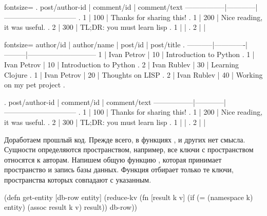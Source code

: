 \pagebreak[4]

\begin{english}
  \begin{text*}{fontsize=\small}
. post/author-id | comment/id |         comment/text
-----------------|------------|------------------------------
.              1 |        100 | Thanks for sharing this!
.              1 |        200 | Nice reading, it was useful.
.              2 |        300 | TL;DR: you must learn lisp
.              1 |            |
.              2 |            |
  \end{text*}
\end{english}

\else

\begin{english}
  \begin{text*}{fontsize=\small}
 author/id | author/name | post/id |         post/title         .
-----------|-------------|---------|-----------------------------
         1 | Ivan Petrov |      10 | Introduction to Python     .
         1 | Ivan Petrov |      10 | Introduction to Python     .
         2 | Ivan Rublev |      30 | Learning Clojure           .
         1 | Ivan Petrov |      20 | Thoughts on LISP           .
         2 | Ivan Rublev |      40 | Working on my pet project  .

. post/author-id | comment/id |         comment/text
-----------------|------------|------------------------------
.              1 |        100 | Thanks for sharing this!
.              1 |        200 | Nice reading, it was useful.
.              2 |        300 | TL;DR: you must learn lisp
.              1 |            |
.              2 |            |
  \end{text*}
\end{english}

\fi

Доработаем прошлый код. Прежде всего, в функциях ,  и других нет смысла. Сущности определяются пространством, например, все ключи с пространством  относятся к авторам. Напишем общую функцию , которая принимает пространство и запись базы данных. Функция отбирает только те ключи, пространства которых совпадают с указанным.

\begin{english}
  \begin{clojure}
(defn get-entity
  [db-row entity]
  (reduce-kv
   (fn [result k v]
     (if (= (namespace k) entity)
       (assoc result k v)
       result))
   {}
   db-row))
  \end{clojure}
\end{english}

